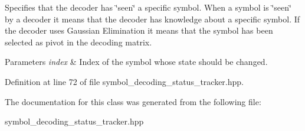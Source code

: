 Specifies that the decoder has \char`\"{}seen\char`\"{} a specific symbol. When a symbol is \char`\"{}seen\char`\"{} by a decoder it means that the decoder has knowledge about a specific symbol. If the decoder uses Gaussian Elimination it means that the symbol has been selected as pivot in the decoding matrix.


\begin{DoxyParams}{Parameters}
{\em index} & Index of the symbol whose state should be changed. \\
\hline
\end{DoxyParams}


Definition at line 72 of file symbol\-\_\-decoding\-\_\-status\-\_\-tracker.\-hpp.



The documentation for this class was generated from the following file\-:\begin{DoxyCompactItemize}
\item 
symbol\-\_\-decoding\-\_\-status\-\_\-tracker.\-hpp\end{DoxyCompactItemize}
